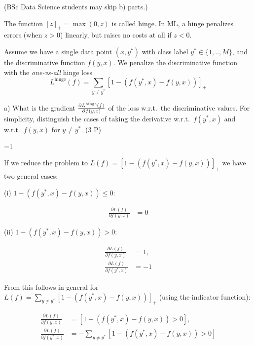 

\renewcommand{\course}{Machine Learning}
\renewcommand{\exnum}{3}

\exercises

(BSc Data Science students may skip b) parts.)



The function $[z]_+ = \max(0,z)$ is called hinge. In ML, a hinge
penalizes errors (when $z>0$) linearly, but raises no costs at all if
$z<0$.

Assume we have a single data point $(x,y^*)$ with class label
$y^*\in\{1,..,M\}$, and the discriminative function $f(y,x)$. We
penalize the discriminative function with the \emph{one-vs-all} hinge
loss
$$L^\text{hinge}(f) =  \sum_{y\not=y^*} [1 - (f(y^*,x)-f(y,x))]_+$$

a) What is the gradient $\frac{\partial L^\text{hinge}(f)}{\partial f(y,x)}$
of the loss w.r.t.\ the discriminative values. For simplicity,
distinguish the cases of taking the derivative w.r.t.\ $f(y^*,x)$ and
w.r.t.\ $f(y,x)$ for $y\not= y^*$. (3 P)

\ifnum\value{solutions}=1
\begin{solution}
	If we reduce the problem to $L(f) = [1 - (f(y^*, x) - f(y,x))]_+$ we have two general cases:
	
	(i) $1 - (f(y^*, x) - f(y,x)) \leq 0$:
	
	\begin{align*}
		\frac{\partial L(f)}{\partial f(y,x)} &= 0
	\end{align*}

	(ii) $1 - (f(y^*, x) - f(y,x)) > 0$:
	
	\begin{align*}
		\frac{\partial L(f)}{\partial f(y,x)} &= 1, \\
		\frac{\partial L(f)}{\partial f(y^*,x)} &= -1
	\end{align*}

	From this follows in general for $L(f) = \sum_{y \neq y^*} [1 - (f(y^*, x) - f(y,x))]_+$
	(using the indicator function):
	
	\begin{align*}
		\frac{\partial L(f)}{\partial f(y,x)} &= [1 - (f(y^*, x) - f(y,x)) > 0], \\
		\frac{\partial L(f)}{\partial f(y^*,x)} &= -\sum_{y \neq y^*} [1 - (f(y^*, x) - f(y,x)) > 0]
	\end{align*}
\end{solution}
\fi

